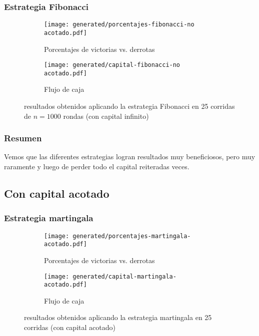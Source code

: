 \documentclass{article}
\begin{document}
  \subsubsection{Estrategia Fibonacci}
  \begin{figure}[H]
    \centering
    \begin{subfigure}{0.5\textwidth}
      \centering
      \texttt{[image: generated/porcentajes-fibonacci-no acotado.pdf]}
      \caption{Porcentajes de victorias vs. derrotas}
    \end{subfigure}%
    \begin{subfigure}{0.5\textwidth}
      \centering
      \texttt{[image: generated/capital-fibonacci-no acotado.pdf]}
      \caption{Flujo de caja}
    \end{subfigure}
    \caption{resultados obtenidos aplicando la estrategia Fibonacci en 25 corridas de $n = 1000$ rondas (con capital infinito)}
  \end{figure}

  \subsubsection{Resumen}

  Vemos que las diferentes estrategias logran resultados muy beneficiosos, pero muy raramente y luego de perder todo el
  capital reiteradas veces.

  \subsection{Con capital acotado}
  \subsubsection{Estrategia martingala}
  \begin{figure}[H]
    \centering
    \begin{subfigure}{0.5\textwidth}
      \centering
      \texttt{[image: generated/porcentajes-martingala-acotado.pdf]}
      \caption{Porcentajes de victorias vs. derrotas}
    \end{subfigure}%
	\begin{subfigure}{0.5\textwidth}
	  \centering
	    \texttt{[image: generated/capital-martingala-acotado.pdf]}
      \caption{Flujo de caja}
    \end{subfigure}
    \caption{resultados obtenidos aplicando la estrategia martingala en 25 corridas (con capital acotado)}
  \end{figure}
\end{document}
